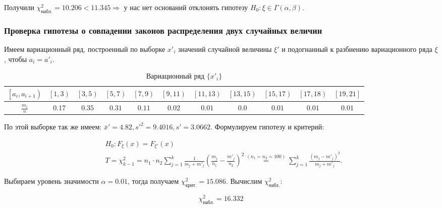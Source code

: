 \documentclass{report}
\begin{document}
Получили $\chi^2_{\text{набл.}} = 10.206 < 11.345 \Rightarrow$ у нас нет оснований отклонять гипотезу $H_0 : \xi \in \Gamma\left(\alpha, \beta\right)$.

\newpage

\subsubsection*{Проверка гипотезы о совпадении законов распределения двух случайных величин}

Имеем вариационный ряд, построенный по выборке ${x'_i}$ значений случайной величины $\xi'$ и подогнанный к разбиению вариационного ряда $\xi$, чтобы $a_i = a'_i$.

\begin{table}[h]
\begin{tabularx}{\textwidth}{|c|c|c|c|c|c|c|c|c|c|c|}
\hline
    $\left [a_i, a_{i+1}\right)$ & $\left [1, 3\right )$ & $\left [3, 5\right )$ & $\left [5, 7\right )$ & $\left [7, 9\right )$ & $\left [9, 11\right )$ & $\left [11, 13\right )$ & $\left [13, 15\right )$ & $\left [15, 17\right )$ & $\left [17, 18\right )$ & $\left [19, 21\right ]$ \\
\hline
    $\frac{m_i}{n}$ & $0.17$ & $0.35$ & $0.31$ & $0.11$ & $0.02$ & $0.01$ & $0.0$ & $0.01$ & $0.01$ & $0.01$ \\
\hline
\end{tabularx}
\setcounter{table}{1}
\caption {Вариационный ряд $\{ x'_i \}$}
\end{table}

По этой выборке так же имеем: $\bar x' = 4.82, s'^2 = 9.4016, s' = 3.0662$. Формулируем гипотезу и критерий:

\begin{equation*}
\begin{split}
& H_0 : F_{\xi}(x) = F_{\xi'}(x) \\
& T = \chi^2_{k-1} = n_1 \cdot n_2 \sum \limits_{j=1}^k \frac{1}{m_j + m'_j} \left( \frac{m_j}{n_1} - \frac{m'_j}{n_2} \right)^2 \stackrel{(n_1 = n_2 = 100)}{=} \sum \limits_{j=1}^k \frac{\left( m_j - m'_j\right)^2}{m_j + m'_j}.
\end{split}
\end{equation*}

Выбираем уровень значимости $\alpha = 0.01$, тогда получаем $\chi^2_{\text{крит.}} = 15.086$. Вычислим $\chi^2_{\text{набл.}}$:

\begin{equation*}
\chi^2_{\text{набл.}} = 16.332 
\end{equation*}
\end{document}
